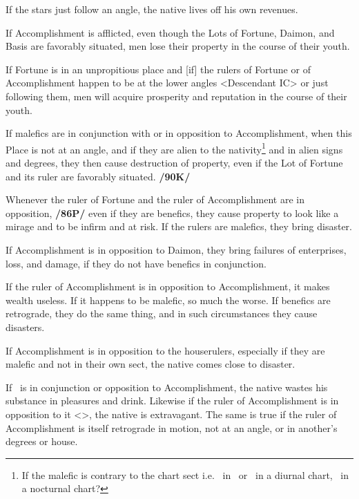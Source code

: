 If the stars just follow an angle, the native lives off his own revenues.

If Accomplishment is afflicted, even though the Lots of Fortune, Daimon, and Basis are favorably situated, men lose their property in the course of their youth. 

If Fortune is in an unpropitious place and [if] the rulers of Fortune or of Accomplishment happen to be at the lower angles <Descendant IC> or just following them, men will acquire prosperity and reputation in the course of their youth. 

If malefics are in conjunction with or in opposition to Accomplishment, when this Place is not at an angle, and if they are alien to the nativity\footnote{If the malefic is contrary to the chart sect i.e. \Mars\, in \Conjunction\, or \Opposition\, in a diurnal chart, \Saturn\, in a nocturnal chart?} and in alien signs and degrees, they then cause destruction of property, even if the Lot of Fortune and its ruler are favorably situated. \textbf{/90K/}

Whenever the ruler of Fortune and the ruler of Accomplishment are in opposition, \textbf{/86P/} even if they are benefics, they cause property to look like a mirage and to be infirm and at risk. If the rulers are malefics, they bring disaster. 

If Accomplishment is in opposition to Daimon, they bring failures of enterprises, loss, and damage, if they do not have benefics in conjunction. 

If the ruler of Accomplishment is in opposition to Accomplishment, it makes wealth useless. If it happens to be malefic, so much the worse. \mnbm If benefics are retrograde, they do the same thing, and in such circumstances they cause disasters. 

If Accomplishment is in opposition to the houserulers, especially if they are malefic and not in their own sect, the native comes close to disaster. 

If \Mars\, is in conjunction or opposition to Accomplishment, the native wastes his substance in pleasures and drink. Likewise if the ruler of Accomplishment is in
opposition to it <\Mars>, the native is extravagant. The same is true if the ruler of Accomplishment is itself retrograde in motion, not at an angle, or in another’s degrees or house.

\newpage